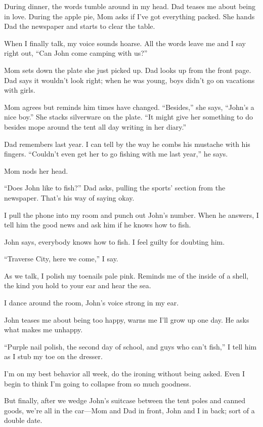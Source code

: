\documentclass[twoside,10pt]{book}
\begin{document}
During dinner, the words tumble around in my head. Dad teases me about
being in love. Dur­ing the apple pie, Mom asks if I've got everything
packed. She hands Dad the newspaper and starts to clear the table.

When I finally talk, my voice sounds hoarse. All the words leave me and
I say right out, ``Can John come camping with us?''

Mom sets down the plate she just picked up. Dad looks up from the front
page. Dad says it wouldn't look right; when he was young, boys didn't go
on vacations with girls.

Mom agrees but reminds him times have changed. ``Besides,'' she says,
``John's a nice boy.'' She stacks silverware on the plate. ``It might
give her something to do besides mope around the tent all day writing in
her diary.''

Dad remembers last year. I can tell by the way he combs his mustache
with his fingers. ``Couldn't even get her to go fishing with me last
year,'' he says.

Mom nods her head.

``Does John like to fish?'' Dad asks, pulling the sports' section from
the newspaper. That's his way of saying okay.

I pull the phone into my room and punch out John's number. When he
answers, I tell him the good news and ask him if he knows how to fish.

John says, everybody knows how to fish. I feel guilty for doubting him.

``Traverse City, here we come,'' I say.

As we talk, I polish my toenails pale pink. Reminds me of the inside of
a shell, the kind you hold to your ear and hear the sea.

I dance around the room, John's voice strong in my ear.

John teases me about being too happy, warns me I'll grow up one day. He
asks what makes me unhappy.

``Purple nail polish, the second day of school, and guys who can't
fish,'' I tell him as I stub my toe on the dresser.

I'm on my best behavior all week, do the ironing without being
\clearpage
asked.
Even I begin to think I'm going to collapse from so much goodness.

But finally, after we wedge John's suitcase between the tent poles and
canned goods, we're all in the car---Mom and Dad in front, John and I in
back; sort of a double date.
\end{document}
